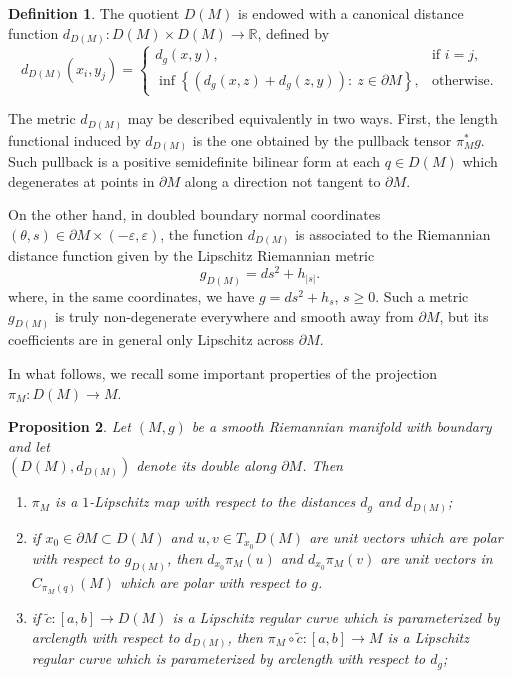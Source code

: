 \documentclass[11pt]{article}
\theoremstyle{definition}
\newtheorem{definition}{Definition}[section]
\theoremstyle{remark}
\theoremstyle{plain}
\newtheorem{proposition}[definition]{Proposition}
\newcommand{\R}{\mathbb{R}}
\begin{document}
\begin{definition}
The quotient $D(M)$ is endowed with a canonical distance function $d_{D(M)}:D(M)\times D(M)\to \R$, defined by
$$d_{D(M)}(x_i,y_j)=\begin{cases}
                      d_g(x,y), & \mbox{if } i=j, \\
                      \inf \left\{(d_g(x,z)+d_g(z,y)):\ z\in \partial M\right\}, & \mbox{otherwise}.
                    \end{cases}$$ 
\end{definition}

The metric $d_{D(M)}$ may be described equivalently in two ways. First, the length functional induced by $d_{D(M)}$ is the one obtained by the pullback tensor $\pi_M^*g$. Such pullback is a positive semidefinite bilinear form at each $q\in D(M)$ which degenerates at points in $\partial M$ along a direction not tangent to $\partial M$. 

On the other hand, in doubled boundary normal coordinates $(\theta,s)\in \partial M\times (-\varepsilon,\varepsilon)$, the function $d_{D(M)}$ is associated to the Riemannian distance function given by the Lipschitz Riemannian metric
$$g_{D(M)}=ds^2+h_{|s|}.$$
where, in the same coordinates, we have $g = ds^2+h_s$, $s\ge 0$. Such a metric $g_{D(M)}$ is truly non-degenerate everywhere and smooth away from $\partial M$, but its coefficients are in general only Lipschitz across $\partial M$.

In what follows, we recall some important properties of the projection $\pi_M:D(M)\to M$.

\begin{proposition}\label{prop:double_projection}
  Let $(M,g)$ be a smooth Riemannian manifold with boundary and let\\ $(D(M),d_{D(M)})$ denote its double along $\partial M$. Then
  \begin{enumerate}
    \item $\pi_M$ is a $1$-Lipschitz map with respect to the distances $d_g$ and $d_{D(M)}$;
    \item if $x_0\in \partial M\subset D(M)$ and $u,v\in T_{x_0}D(M)$ are unit vectors which are polar with respect to $g_{D(M)}$, then $d_{x_0}\pi_M(u)$ and $d_{x_0}\pi_M(v)$ are unit vectors in $C_{\pi_M(q)}(M)$ which are polar with respect to $g$.
    \item if $\tilde c:[a,b]\to D(M)$ is a Lipschitz regular curve which is parameterized by arclength with respect to $d_{D(M)}$, then $\pi_M\circ \tilde c: [a,b]\to M$ is a Lipschitz regular curve which is parameterized by arclength with respect to $d_g$;
  \end{enumerate} 
\end{proposition}
\end{document}

